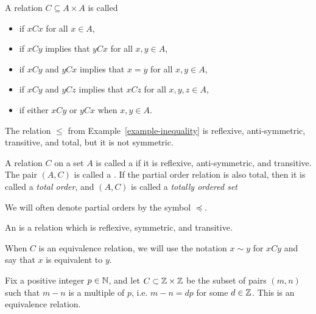 \begin{defn}
  A relation $C \subseteq A \times A$ is called
  \begin{itemize}
    \item {} if $xCx$ for all $x \in A$,
    \item {} if $xCy$ implies that $yCx$ for all $x,y \in A$,
    \item {} if $xCy$ and $yCx$ implies that $x = y$ for all $x, y \in A$,
    \item {} if $xCy$ and $yCz$ implies that $xCz$ for all $x,y,z \in A$,
    \item {} if either $xCy$ or $yCx$ when $x, y \in A$.
  \end{itemize}
\end{defn}
\begin{example}
  The relation $\leq$ from Example~\ref{example-inequality} is reflexive, anti-symmetric, transitive, and total, but it is not symmetric.
\end{example}
\begin{defn}
  \label{def-poset}
  A relation $C$ on a set $A$ is called a  if it is reflexive, anti-symmetric, and transitive. The pair $(A,C)$ is called a . If the partial order relation is also total, then it is called a \emph{total order}, and $(A,C)$ is called a \emph{totally ordered set}
\end{defn}
We will often denote partial orders by the symbol $\preceq$.
\begin{defn}
  An  is a relation which is reflexive, symmetric, and transitive.
\end{defn}
When $C$ is an equivalence relation, we will use the notation $x \sim y$ for $xCy$ and say that $x$ is equivalent to $y$.
\begin{example}
  \label{congruence}
  Fix a positive integer $p \in \mathbb{N}$, and let $C \subset \mathbb{Z} \times \mathbb{Z}$ be the subset of pairs $(m,n)$ such that $m-n$ is a multiple of $p$, i.e. $m-n = dp$ for some $d \in \mathbb{Z}$. This is an equivalence relation.
\end{example}
